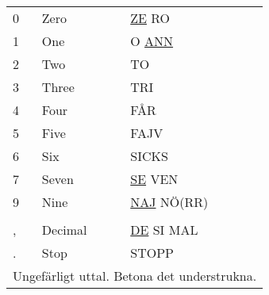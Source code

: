 \begin{table}[htbp]
\begin{tabular}{lll}
    0 & Zero & \underline{ZE} RO \\
    1 & One & O \underline{ANN} \\
    2 & Two & TO \\
    3 & Three & TRI \\
    4 & Four & FÅR \\
    5 & Five & FAJV \\
    6 & Six & SICKS \\
    7 & Seven & \underline{SE} VEN \\
    9 & Nine & \underline{NAJ} NÖ(RR) \\
    & & \\
    , & Decimal & \underline{DE} SI MAL \\
    . & Stop & STOPP \\
    \multicolumn{3}{l}{Ungefärligt uttal. Betona det understrukna.}
  \end{tabular}
\end{table}


